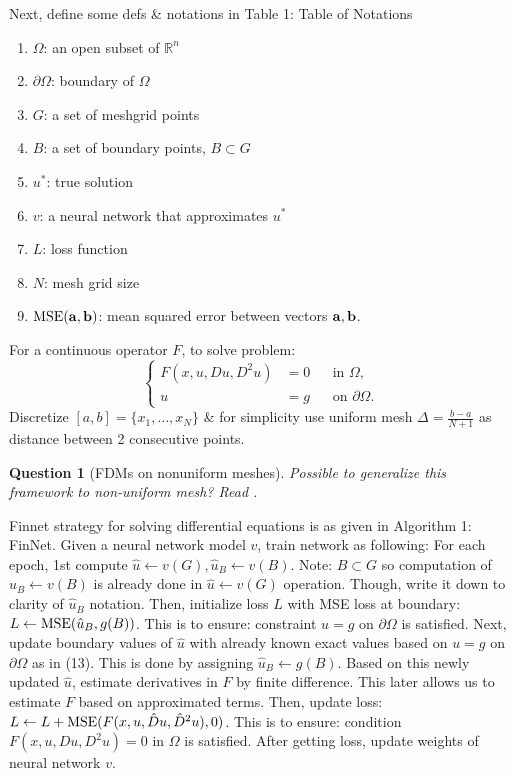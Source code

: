 \documentclass{article}
\newtheorem{question}{Question}
\begin{document}
\begin{itemize}
	Next, define some defs \& notations in {\sf Table 1: Table of Notations}
	\begin{enumerate}
		\item $\Omega$: an open subset of $\mathbb{R}^n$
		\item $\partial\Omega$: boundary of $\Omega$
		\item $G$: a set of meshgrid points
		\item $B$: a set of boundary points, $B\subset G$
		\item $u^*$: true solution
		\item $v$: a neural network that approximates $u^*$
		\item $L$: loss function
		\item $N$: mesh grid size
		\item ${\rm MSE}({\bf a},{\bf b})$: mean squared error between vectors ${\bf a},{\bf b}$.
	\end{enumerate}
	For a continuous operator $F$, to solve problem:
	\begin{equation*}
		\left\{\begin{split}
			F(x,u,Du,D^2u) &= 0&&\mbox{in }\Omega,\\
			u &= g&&\mbox{on }\partial\Omega.
		\end{split}\right.
	\end{equation*}
	Discretize $[a,b] = \{x_1,\ldots,x_N\}$ \& for simplicity use uniform mesh $\Delta =  \frac{b - a}{N + 1}$ as distance between 2 consecutive points.
	\begin{question}[FDMs on nonuniform meshes]
		Possible to generalize this framework to non-uniform mesh? Read \cite{LeVeque2007}.
	\end{question}
	Finnet strategy for solving differential equations is as given in {\sf Algorithm 1: FinNet}. Given a neural network model $v$, train network as following: For each epoch, 1st compute $\hat{u}\leftarrow v(G),\hat{u}_B\leftarrow v(B)$. Note: $B\subset G$ so computation of $\hat{u}_B\leftarrow v(B)$ is already done in $\hat{u}\leftarrow v(G)$ operation. Though, write it down to clarity of $\hat{u}_B$ notation. Then, initialize loss $L$ with MSE loss at boundary: $L\leftarrow{\rm MSE}(\hat{u}_B,g(B))$. This is to ensure: constraint $u = g$ on $\partial\Omega$ is satisfied. Next, update boundary values of $\hat{u}$ with already known exact values based on $u = g$ on $\partial\Omega$ as in (13). This is done by assigning $\hat{u}_B\leftarrow g(B)$. Based on this newly updated $\hat{u}$, estimate derivatives in $F$ by finite difference. This later allows us to estimate $F$ based on approximated terms. Then, update loss: $L\leftarrow L + {\rm MSE}(F(x,u,\hat{D}u,\hat{D}^2u),0)$. This is to ensure: condition $F(x,u,Du,D^2u) = 0$ in $\Omega$ is satisfied. After getting loss, update weights of neural network $v$.


\end{itemize}
\end{document}
